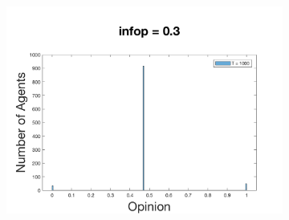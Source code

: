 \documentclass[11pt]{article}
\begin{document}
\begin{figure}[!htb]
\begin{subfigure}[!htb]{\textwidth}
  \includegraphics[width=\linewidth]{p_20/gen_plot_201712171361653386e+01.png}
\endminipage
\end{subfigure}



\end{figure}
\end{document}
